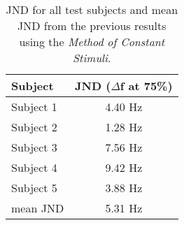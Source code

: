 \begin{table}[H]
\centering
\begin{tabular}{l|c}
Subject     & JND ($\Delta$f at 75\%) \\\hline
Subject 1   & 4.40 Hz                 \\\hline
Subject 2   & 1.28 Hz                 \\\hline
Subject 3   & 7.56 Hz                 \\\hline
Subject 4   & 9.42 Hz                 \\\hline
Subject 5   & 3.88 Hz                 \\\hline
mean JND & 5.31 Hz       
\end{tabular}
\caption{JND for all test subjects and mean JND from the previous results using the \textit{Method of Constant Stimuli}.}
\label{tab:JND_constant}         
\end{table}
\noindent